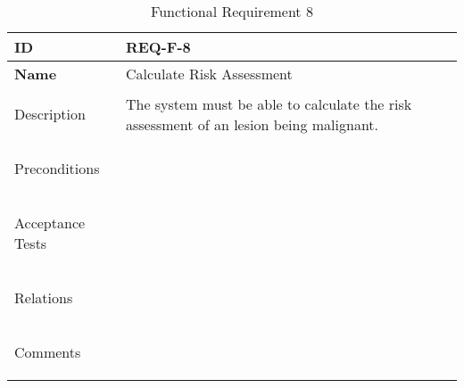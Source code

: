 \begin{table}[H]
    \begin{tabular}[t]{ | >{\bfseries}l | p{9.5cm} |}

    \hline
    ID
    &  REQ-F-8 \\ \hline

    Name
    & Calculate Risk Assessment \\ \hline

    Description
    & The system must be able to calculate the risk assessment of an lesion being malignant. \\ \hline

    Preconditions
    &  \\ \hline

    Acceptance Tests
    & \\ \hline

    Relations
    &  \\ \hline

    Comments
    &  \\ \hline

    \end{tabular}

    \caption{Functional Requirement 8}
    \label{fig:req_f_8}

\end{table}